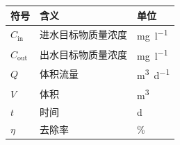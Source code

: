 \begingroup\tjsmall
\begin{longtable}{@{}p{}p{}p{}@{}}
\toprule
符号 & 含义 & 单位\\\midrule
\endhead
$C_{\mathrm{in}}$ & 进水目标物质量浓度 & \unit{\milli\gram\per\litre}\\
$C_{\mathrm{out}}$ & 出水目标物质量浓度 & \unit{\milli\gram\per\litre}\\
$Q$ & 体积流量 & \unit{\metre\cubed\per\day}\\
$V$ & 体积 & \unit{\metre\cubed}\\
$t$ & 时间 & \unit{\day}\\
$\eta$ & 去除率 & \unit{\percent}\\
\bottomrule
\end{longtable}
\par\clearpage\endgroup
